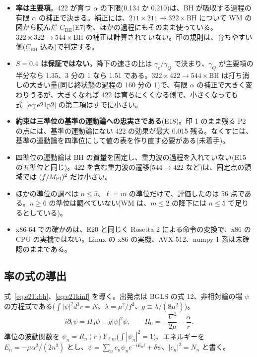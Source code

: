 \begin{caveat}
\begin{itemize}
\item \textbf{率は主要項}。422 が育つ $\alpha$ の下限(0.134 か 0.210)は、BH が吸収する過程の有限 $\alpha$ の補正で決まる。補正には、$211\times211\to322\times\mathrm{BH}$ について WM の図から読んだ $C_\mathrm{BH}$(E7)を、ほかの過程にもそのまま使っている。$322\times322\to544\times\mathrm{BH}$ の補正は計算されていない。印の規則は、育ちやすい側($C_\mathrm{BH}$ 込み)で判定する。
\item \textbf{$S=0.4$ は保証ではない}。降下の速さの比は $\gamma_c/\gamma_Q$ で決まり、$\gamma_Q$ が主要項の半分なら 1.35、3 分の 1 なら 1.51 である。$322\times422\to544\times\mathrm{BH}$ は打ち消しの大きい量(同じ終状態の過程の 160 分の 1)で、有限 $\alpha$ の補正で大きく変わりうるが、大きくなれば 422 は育ちにくくなる側で、小さくなっても式~\eqref{eq:e21p2} の第二項はすでに小さい。
\item \textbf{約束は三準位の基準の運動論への忠実さである}(E18)。印 1 のまま残る P2 の点には、基準の運動論にない 422 の効果が最大 0.015 残る。なくすには、基準の運動論を四準位にして値の表を作り直す必要がある(未着手)。
\item 四準位の運動論は BH の質量を固定し、重力波の過程を入れていない(E15 の五準位と同じ)。422 を含む重力波の遷移($544\to422$ など)は、固定点の領域では $(f/M_\mathrm{Pl})^2$ だけ小さい。
\item ほかの準位の調べは $n\le5$、$\ell=m$ の準位だけで、評価したのは 56 点である。$n\ge6$ の準位は調べていない(WM は、$m\le2$ の降下には $n\le5$ で足りるとしている)。
\item x86-64 での確かめは、E20 と同じく Rosetta 2 による命令の変換で、x86 の CPU の実機ではない。Linux の x86 の実機、AVX-512、numpy 1 系は未確認のままである。
\end{itemize}
\end{caveat}

\subsection{率の式の導出}\label{sec:e21deriv}

式~\eqref{eq:e21kbh}、\eqref{eq:e21kinf} を導く。出発点は BGLS の式 12、非相対論の場 $\psi$ の方程式である($\int|\psi|^2d^3r=N$、$\lambda=\mu^2/f^2$、$g\equiv\lambda/(8\mu^2)$)。
\begin{equation}
i\partial_t\psi=H_0\psi-g|\psi|^2\psi,\qquad H_0=-\frac{\nabla^2}{2\mu}-\frac{\alpha}{r}.
\end{equation}
準位の波動関数を $\psi_n=R_n(r)Y_{\ell m}$($\int|\psi_n|^2=1$)、エネルギーを $E_n=-\mu\alpha^2/(2n^2)$ とし、$\psi=\sum_nc_n\psi_ne^{-iE_nt}+\delta\psi$、$|c_n|^2=N_n$ と書く。

